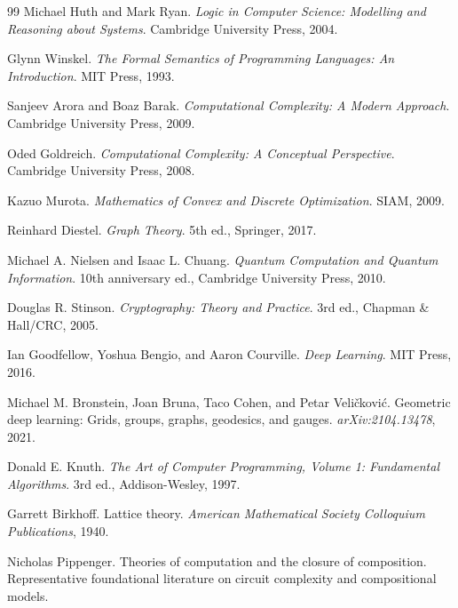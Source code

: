 \documentclass[11pt]{article}
\begin{document}
\begin{thebibliography}{99}
Michael Huth and Mark Ryan.
\newblock \emph{Logic in Computer Science: Modelling and Reasoning about Systems}.
\newblock Cambridge University Press, 2004.

Glynn Winskel.
\newblock \emph{The Formal Semantics of Programming Languages: An Introduction}.
\newblock MIT Press, 1993.

Sanjeev Arora and Boaz Barak.
\newblock \emph{Computational Complexity: A Modern Approach}.
\newblock Cambridge University Press, 2009.

Oded Goldreich.
\newblock \emph{Computational Complexity: A Conceptual Perspective}.
\newblock Cambridge University Press, 2008.

Kazuo Murota.
\newblock \emph{Mathematics of Convex and Discrete Optimization}.
\newblock SIAM, 2009.

Reinhard Diestel.
\newblock \emph{Graph Theory}.
\newblock 5th ed., Springer, 2017.

Michael A. Nielsen and Isaac L. Chuang.
\newblock \emph{Quantum Computation and Quantum Information}.
\newblock 10th anniversary ed., Cambridge University Press, 2010.

Douglas R. Stinson.
\newblock \emph{Cryptography: Theory and Practice}.
\newblock 3rd ed., Chapman \& Hall/CRC, 2005.

Ian Goodfellow, Yoshua Bengio, and Aaron Courville.
\newblock \emph{Deep Learning}.
\newblock MIT Press, 2016.

Michael M. Bronstein, Joan Bruna, Taco Cohen, and Petar Veli\v{c}kovi\'c.
\newblock Geometric deep learning: Grids, groups, graphs, geodesics, and gauges.
\newblock \emph{arXiv:2104.13478}, 2021.

Donald E. Knuth.
\newblock \emph{The Art of Computer Programming, Volume 1: Fundamental Algorithms}.
\newblock 3rd ed., Addison-Wesley, 1997.

Garrett Birkhoff.
\newblock Lattice theory.
\newblock \emph{American Mathematical Society Colloquium Publications}, 1940.

Nicholas Pippenger.
\newblock Theories of computation and the closure of composition.
\newblock Representative foundational literature on circuit complexity and compositional models.

\end{thebibliography}
\end{document}
